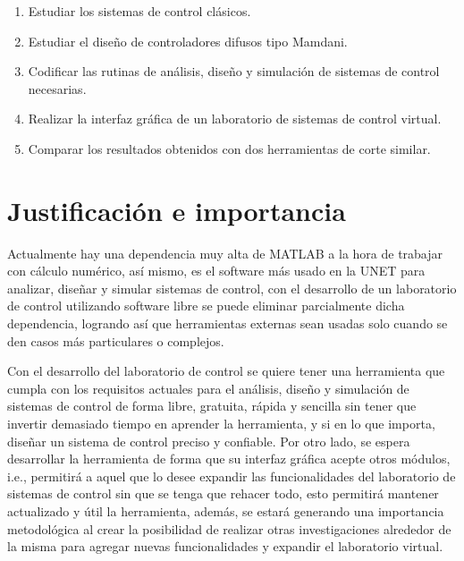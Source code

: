 		\begin{enumerate}[leftmargin=\parindent]
			
			\item Estudiar los sistemas de control clásicos.
			
			\item Estudiar el diseño de controladores difusos tipo Mamdani.
			
			\item Codificar las rutinas de análisis, diseño y simulación de sistemas de control necesarias.
			
			\item Realizar la interfaz gráfica de un laboratorio de sistemas de control virtual.
			
			\item Comparar los resultados obtenidos con dos herramientas de corte similar.
		
	\end{enumerate}

\section{Justificación e importancia}
	
	Actualmente hay una dependencia muy alta de MATLAB a la hora de trabajar con cálculo numérico, así mismo, es el software más usado en la UNET para analizar, diseñar y simular sistemas de control, con el desarrollo de un laboratorio de control utilizando software libre se puede eliminar parcialmente dicha dependencia, logrando así que herramientas externas sean usadas solo cuando se den casos más particulares o complejos.
	
	Con el desarrollo del laboratorio de control se quiere tener una herramienta que cumpla con los requisitos actuales para el análisis, diseño y simulación de sistemas de control de forma libre, gratuita, rápida y sencilla sin tener que invertir demasiado tiempo en aprender la herramienta, y si en lo que importa, diseñar un sistema de control preciso y confiable.
	Por otro lado, se espera desarrollar la herramienta de forma que su interfaz gráfica acepte otros módulos, i.e., permitirá a aquel que lo desee expandir las funcionalidades del laboratorio de sistemas de control sin que se tenga que rehacer todo, esto permitirá mantener actualizado y útil la herramienta, además, se estará generando una importancia metodológica al crear la posibilidad de realizar otras investigaciones alrededor de la misma para agregar nuevas funcionalidades y expandir el laboratorio virtual.
	
